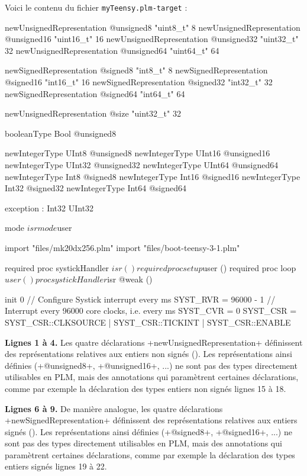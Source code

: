 
Voici le contenu du fichier \texttt{myTeensy.plm-target} :
\begin{PLM}[1]
newUnsignedRepresentation @unsigned8  "uint8_t"   8
newUnsignedRepresentation @unsigned16 "uint16_t" 16
newUnsignedRepresentation @unsigned32 "uint32_t" 32
newUnsignedRepresentation @unsigned64 "uint64_t" 64

newSignedRepresentation @signed8  "int8_t"   8
newSignedRepresentation @signed16 "int16_t" 16
newSignedRepresentation @signed32 "int32_t" 32
newSignedRepresentation @signed64 "int64_t" 64

newUnsignedRepresentation @size "uint32_t" 32

booleanType Bool @unsigned8

newIntegerType UInt8  @unsigned8
newIntegerType UInt16 @unsigned16
newIntegerType UInt32 @unsigned32
newIntegerType UInt64 @unsigned64
newIntegerType Int8  @signed8
newIntegerType Int16 @signed16
newIntegerType Int32 @signed32
newIntegerType Int64 @signed64

exception : Int32 UInt32

mode $isr
mode $user

import "files/mk20dx256.plm"
import "files/boot-teensy-3-1.plm"

required proc systickHandler $isr ()
required proc setup $user ()
required proc loop $user ()

proc systickHandler $isr @weak () {
}

init 0 { // Configure Systick interrupt every ms
  SYST_RVR = 96000 - 1 // Interrupt every 96000 core clocks, i.e. every ms
  SYST_CVR = 0
  SYST_CSR = SYST_CSR::CLKSOURCE | SYST_CSR::TICKINT | SYST_CSR::ENABLE
}
\end{PLM}

{\bf Lignes 1 à 4.} Les quatre déclarations \plm+newUnsignedRepresentation+ définissent des représentations relatives aux entiers non signés (). Les représentations ainsi définies (\plm+@unsigned8+, \plm+@unsigned16+, ...) ne sont pas des types directement utilisables en PLM, mais des annotations qui paramètrent certaines déclarations, comme par exemple la déclaration des types entiers non signés lignes 15 à 18.

{\bf Lignes 6 à 9.} De manière analogue, les quatre déclarations \plm+newSignedRepresentation+ définissent des représentations relatives aux entiers signés (). Les représentations ainsi définies (\plm+@signed8+, \plm+@signed16+, ...) ne sont pas des types directement utilisables en PLM, mais des annotations qui paramètrent certaines déclarations, comme par exemple la déclaration des types entiers signés lignes 19 à 22.

